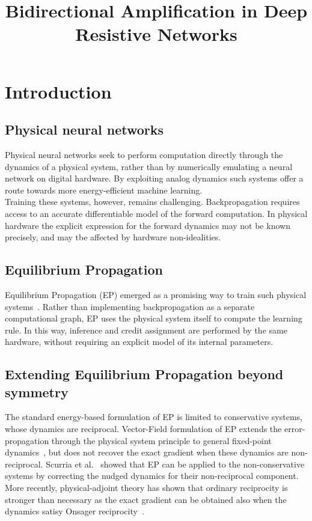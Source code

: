 \documentclass{article}
\title{Bidirectional Amplification in Deep Resistive Networks}
\author{}
\date{}
\begin{document}
\maketitle

\section{Introduction}
\label{sec:introduction}

\subsection{Physical neural networks}


Physical neural networks seek to perform computation directly through the
dynamics of a physical system, rather than by numerically emulating a neural
network on digital hardware. By exploiting analog dynamics such systems offer a route towards more energy-efficient machine learning.\\
Training these systems, however, remains challenging. Backpropagation requires access to an accurate differentiable model of the forward
computation. In physical hardware the explicit expression for the forward
dynamics may not be known precisely, and may tbe affected by hardware non-idealities.





\subsection{Equilibrium Propagation}
Equilibrium Propagation (EP) emerged as a promising way to train such physical
systems~\cite{scellier2017equilibrium}. Rather than implementing
backpropagation as a separate computational graph, EP uses the physical system
itself to compute the learning rule. In this way, inference and credit
assignment are performed by the same hardware, without requiring an explicit
model of its internal parameters.

\subsection{Extending Equilibrium Propagation beyond symmetry}

The standard energy-based formulation of EP is limited to conservative systems, whose dynamics are reciprocal. Vector-Field formulation of EP extends the error-propagation through the physical system principle to general fixed-point dynamics~\cite{scellier2018generalization}, but does not recover the exact gradient when these dynamics are non-reciprocal. Scurria et al.~\cite{scurria2026nonconservative} showed that EP can be applied to the non-conservative systems by correcting the nudged dynamics for their non-reciprocal component. More recently, physical-adjoint theory has shown that ordinary reciprocity is stronger than necessary as the exact gradient can be obtained also when the dynamics satisy Onsager reciprocity~\cite{bosch2026unifying}.
\end{document}
